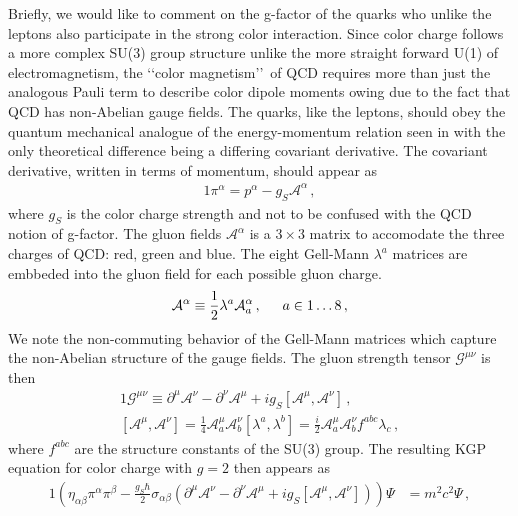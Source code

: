 Briefly, we would like to comment on the g-factor of the quarks who unlike the leptons also participate in the strong color interaction. Since color charge follows a more complex SU(3) group structure unlike the more straight forward U(1) of electromagnetism, the \lq\lq color magnetism\rq\rq\ of QCD requires more than just the analogous Pauli term to describe color dipole moments owing due to the fact that QCD has non-Abelian gauge fields. The quarks, like the leptons, should obey the quantum mechanical analogue of the energy-momentum relation seen in  with the only theoretical difference being a differing covariant derivative. The covariant derivative, written in terms of momentum, should appear as
\begin{alignat}{1}
	\label{eq:spin:08} \pi^{\alpha}=p^{\alpha}-g_{S}\mathcal{A}^{\alpha}\,,
\end{alignat}
where $g_{S}$ is the color charge strength and not to be confused with the QCD notion of g-factor. The gluon fields $\mathcal{A}^{\alpha}$ is a $3\times3$ matrix to accomodate the three charges of QCD: red, green and blue. The eight Gell-Mann $\lambda^{a}$ matrices are embbeded into the gluon field for each possible gluon charge.
\begin{alignat}{1}
	\label{eq:spin:09} \mathcal{A}^{\alpha}\equiv\frac{1}{2}\lambda^{a}\mathcal{A}^{\alpha}_{a}\,,\indent a\in1\ldots8\,,
\end{alignat}
We note the non-commuting behavior of the Gell-Mann matrices which capture the non-Abelian structure of the gauge fields. The gluon strength tensor $\mathcal{G}^{\mu\nu}$ is then
\begin{alignat}{1}
	\label{eq:spin:10a} \mathcal{G}^{\mu\nu}\equiv\partial^{\mu}\mathcal{A}^{\nu}-\partial^{\nu}\mathcal{A}^{\mu}+ig_{S}\left[\mathcal{A}^{\mu},\mathcal{A}^{\nu}\right]\,,\\
	\label{eq:spin:10b} \left[\mathcal{A}^{\mu},\mathcal{A}^{\nu}\right] = \frac{1}{4}\mathcal{A}^{\mu}_{a}\mathcal{A}^{\nu}_{b}\left[\lambda^{a},\lambda^{b}\right]=\frac{i}{2}\mathcal{A}^{\mu}_{a}\mathcal{A}^{\nu}_{b}f^{abc}\lambda_{c}\,,
\end{alignat}
where $f^{abc}$ are the structure constants of the SU(3) group. The resulting KGP equation for color charge with $g=2$ then appears as
\begin{alignat}{1}
	\label{eq:spin:11} \left(\eta_{\alpha\beta}\pi^{\alpha}\pi^{\beta}-\frac{g_{S}\hbar}{2}\sigma_{\alpha\beta}\left(\partial^{\mu}\mathcal{A}^{\nu}-\partial^{\nu}\mathcal{A}^{\mu}+ig_{S}\left[\mathcal{A}^{\mu},\mathcal{A}^{\nu}\right]\right)\right)\Psi&=m^{2}c^{2}\Psi\,,
\end{alignat}

